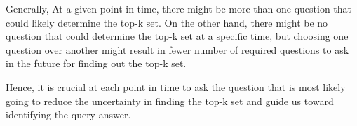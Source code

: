 \begin{example}
    Generally, At a given point in time, there might be more than one question that could likely determine the top-k set. On the other hand, there might be no question that could determine the top-k set at a specific time, but choosing one question over another might result in fewer number of required questions to ask in the future for finding out the top-k set. 
        
    Hence, it is crucial at each point in time to ask the question that is most likely going to reduce the uncertainty in finding the top-k set and guide us toward identifying the query answer.
\end{example}





